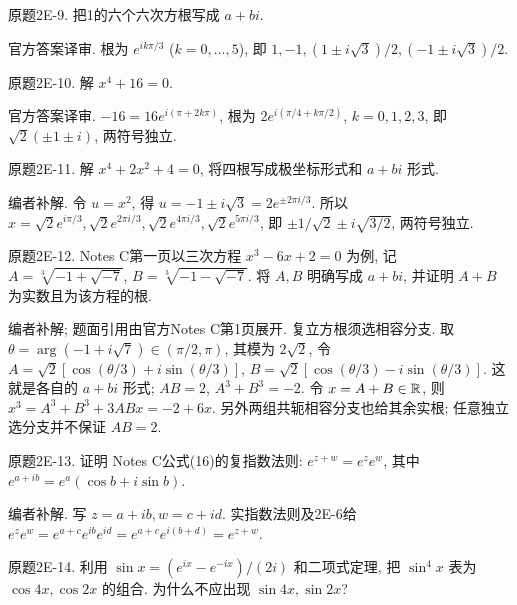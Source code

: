 \begin{exercise}\label{cw:bank-2E-9}
原题2E-9. 把1的六个六次方根写成 $a+bi$.
\end{exercise}
\begin{solution}
官方答案译审. 根为 $e^{ik\pi/3}$ ($k=0,\ldots,5$), 即 $1,-1,(1\pm i\sqrt3)/2,(-1\pm i\sqrt3)/2$.
\end{solution}
\begin{exercise}\label{cw:bank-2E-10}
原题2E-10. 解 $x^4+16=0$.
\end{exercise}
\begin{solution}
官方答案译审. $-16=16e^{i(\pi+2k\pi)}$, 根为 $2e^{i(\pi/4+k\pi/2)}$, $k=0,1,2,3$, 即 $\sqrt2(\pm1\pm i)$, 两符号独立.
\end{solution}
\begin{exercise}\label{cw:bank-2E-11}
原题2E-11. 解 $x^4+2x^2+4=0$, 将四根写成极坐标形式和 $a+bi$ 形式.
\end{exercise}
\begin{solution}
编者补解. 令 $u=x^2$, 得 $u=-1\pm i\sqrt3=2e^{\pm2\pi i/3}$. 所以 $x=\sqrt2e^{i\pi/3},\sqrt2e^{2\pi i/3},\sqrt2e^{4\pi i/3},\sqrt2e^{5\pi i/3}$, 即 $\pm1/\sqrt2\pm i\sqrt{3/2}$, 两符号独立.
\end{solution}
\begin{exercise}\label{cw:bank-2E-12}
原题2E-12. Notes C第一页以三次方程 $x^3-6x+2=0$ 为例, 记 $A=\sqrt[3]{-1+\sqrt{-7}}$, $B=\sqrt[3]{-1-\sqrt{-7}}$. 将 $A,B$ 明确写成 $a+bi$, 并证明 $A+B$ 为实数且为该方程的根.
\end{exercise}
\begin{solution}
编者补解; 题面引用由官方Notes C第1页展开. 复立方根须选相容分支. 取 $\theta=\arg(-1+i\sqrt7)\in(\pi/2,\pi)$, 其模为 $2\sqrt2$, 令 $A=\sqrt2[\cos(\theta/3)+i\sin(\theta/3)]$, $B=\sqrt2[\cos(\theta/3)-i\sin(\theta/3)]$. 这就是各自的 $a+bi$ 形式; $AB=2$, $A^3+B^3=-2$. 令 $x=A+B\in\mathbb R$, 则 $x^3=A^3+B^3+3ABx=-2+6x$. 另外两组共轭相容分支也给其余实根; 任意独立选分支并不保证 $AB=2$.
\end{solution}
\begin{exercise}\label{cw:bank-2E-13}
原题2E-13. 证明 Notes C公式(16)的复指数法则: $e^{z+w}=e^ze^w$, 其中 $e^{a+ib}=e^a(\cos b+i\sin b)$.
\end{exercise}
\begin{solution}
编者补解. 写 $z=a+ib,w=c+id$. 实指数法则及2E-6给 $e^ze^w=e^{a+c}e^{ib}e^{id}=e^{a+c}e^{i(b+d)}=e^{z+w}$.
\end{solution}
\begin{exercise}\label{cw:bank-2E-14}
原题2E-14. 利用 $\sin x=(e^{ix}-e^{-ix})/(2i)$ 和二项式定理, 把 $\sin^4x$ 表为 $\cos4x,\cos2x$ 的组合. 为什么不应出现 $\sin4x,\sin2x$?
\end{exercise}
